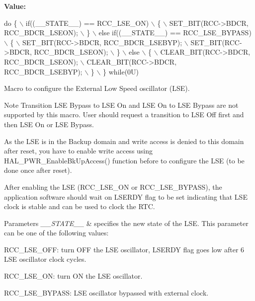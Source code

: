 {\bfseries Value\+:}
\begin{DoxyCode}
\textcolor{keywordflow}{do} \{                                       \(\backslash\)
                      if((\_\_STATE\_\_) == RCC\_LSE\_ON)            \(\backslash\)
                      \{                                        \(\backslash\)
                        SET\_BIT(RCC->BDCR, RCC\_BDCR\_LSEON);    \(\backslash\)
                      \}                                        \(\backslash\)
                      else \textcolor{keywordflow}{if}((\_\_STATE\_\_) == RCC\_LSE\_BYPASS)   \(\backslash\)
                      \{                                        \(\backslash\)
                        SET\_BIT(RCC->BDCR, RCC\_BDCR\_LSEBYP);   \(\backslash\)
                        SET\_BIT(RCC->BDCR, RCC\_BDCR\_LSEON);    \(\backslash\)
                      \}                                        \(\backslash\)
                      else                                     \(\backslash\)
                      \{                                        \(\backslash\)
                        CLEAR\_BIT(RCC->BDCR, RCC\_BDCR\_LSEON);  \(\backslash\)
                        CLEAR\_BIT(RCC->BDCR, RCC\_BDCR\_LSEBYP); \(\backslash\)
                      \}                                        \(\backslash\)
                    \} \textcolor{keywordflow}{while}(0U)
\end{DoxyCode}


Macro to configure the External Low Speed oscillator (L\+SE). 

\begin{DoxyNote}{Note}
Transition L\+SE Bypass to L\+SE On and L\+SE On to L\+SE Bypass are not supported by this macro. User should request a transition to L\+SE Off first and then L\+SE On or L\+SE Bypass. 

As the L\+SE is in the Backup domain and write access is denied to this domain after reset, you have to enable write access using H\+A\+L\+\_\+\+P\+W\+R\+\_\+\+Enable\+Bk\+Up\+Access() function before to configure the L\+SE (to be done once after reset). 

After enabling the L\+SE (R\+C\+C\+\_\+\+L\+S\+E\+\_\+\+ON or R\+C\+C\+\_\+\+L\+S\+E\+\_\+\+B\+Y\+P\+A\+SS), the application software should wait on L\+S\+E\+R\+DY flag to be set indicating that L\+SE clock is stable and can be used to clock the R\+TC. 
\end{DoxyNote}

\begin{DoxyParams}{Parameters}
{\em \+\_\+\+\_\+\+S\+T\+A\+T\+E\+\_\+\+\_\+} & specifies the new state of the L\+SE. This parameter can be one of the following values\+: \begin{DoxyItemize}
\item R\+C\+C\+\_\+\+L\+S\+E\+\_\+\+O\+FF\+: turn O\+FF the L\+SE oscillator, L\+S\+E\+R\+DY flag goes low after 6 L\+SE oscillator clock cycles. \item R\+C\+C\+\_\+\+L\+S\+E\+\_\+\+ON\+: turn ON the L\+SE oscillator. \item R\+C\+C\+\_\+\+L\+S\+E\+\_\+\+B\+Y\+P\+A\+SS\+: L\+SE oscillator bypassed with external clock. \end{DoxyItemize}
\\
\hline
\end{DoxyParams}
